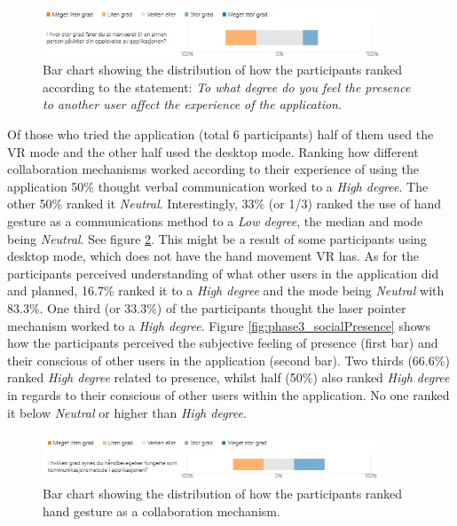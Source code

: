 \begin{figure}[H]
  \centering
   \captionsetup{width=.8\linewidth}
    \includegraphics[width=0.9\textwidth]{fig/phase_3/survey/ValgKompAppPrecence.jpg}
 \caption{Bar chart showing the distribution of how the participants ranked according to the statement: \textit{To what degree do you feel the presence to another user affect the experience of the application}.}
\label{fig:phase3_SurveyPrecenceIncrease}
\end{figure}




Of those who tried the application (total 6 participants) half of them used the VR mode and the other half used the desktop mode. Ranking how different collaboration mechanisms worked according to their experience of using the application 50\% thought verbal communication worked to a \textit{High degree}. The other 50\% ranked it \textit{Neutral}. Interestingly, 33\% (or 1/3) ranked the use of hand gesture as a communications method to a \textit{Low degree}, the median and mode being \textit{Neutral}. See figure \ref{fig:phase3_CollabHandGestures}. This might be a result of some participants using desktop mode, which does not have the hand movement VR has. As for the participants perceived understanding of what other users in the application did and planned, 16.7\% ranked it to a \textit{High degree} and the mode being \textit{Neutral} with 83.3\%. 
One third (or 33.3\%) of the participants thought the laser pointer mechanism worked to a \textit{High degree}. 
Figure \ref{fig:phase3_socialPresence} shows how the participants perceived the subjective feeling of presence (first bar) and their conscious of other users in the application (second bar). Two thirds (66.6\%) ranked \textit{High degree} related to presence, whilst half (50\%) also ranked \textit{High degree} in regards to their 
conscious of other users within the application. No one ranked it below \textit{Neutral} or higher than \textit{High degree}. 

\begin{figure}[H]
  \centering
   \captionsetup{width=.8\linewidth}
    \includegraphics[width=0.9\textwidth]{fig/phase_3/survey/CollabMechHandGestures.jpg}
 \caption{Bar chart showing the distribution of how the participants ranked hand gesture as a collaboration mechanism.}
\label{fig:phase3_CollabHandGestures}
\end{figure}


